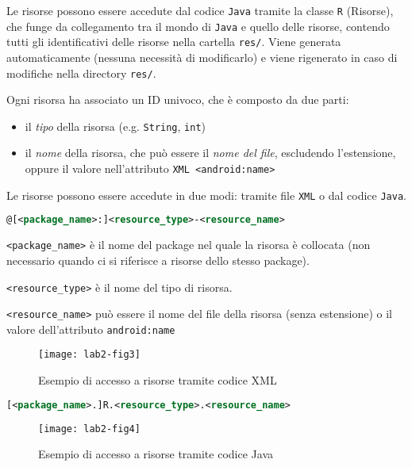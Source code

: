 Le risorse possono essere accedute dal codice \texttt{Java} tramite la classe \texttt{R} (Risorse), che funge da collegamento tra il mondo di \texttt{Java} e quello delle risorse, contendo tutti gli identificativi delle risorse nella cartella \texttt{res/}. Viene generata automaticamente (nessuna necessità di modificarlo) e viene rigenerato in caso di modifiche nella directory \texttt{res/}.

Ogni risorsa ha associato un ID univoco, che è composto da due parti:
\begin{itemize}
\item il \textit{tipo} della risorsa (e.g. \texttt{String}, \texttt{int})
\item il \textit{nome} della risorsa, che può essere il \textit{nome del file}, escludendo l'estensione, oppure il valore nell'attributo \texttt{XML <android:name>}
\end{itemize}

Le risorse possono essere accedute in due modi: tramite file \texttt{XML} o dal codice \texttt{Java}.



\begin{lstlisting}[language=XML, basicstyle=\footnotesize]
@[<package_name>:]<resource_type>-<resource_name>
\end{lstlisting}

\texttt{<package\_name>} è il nome del package nel quale la risorsa è collocata (non necessario quando ci si riferisce a risorse dello stesso package).

\texttt{<resource\_type>} è il nome del tipo di risorsa.

\texttt{<resource\_name>} può essere il nome del file della risorsa (senza estensione) o il valore dell'attributo \texttt{android:name} 

\begin{figure}[htbp]
	\centering
	\texttt{[image: lab2-fig3]}
	\caption[Accesso Risorse XML]{Esempio di accesso a risorse tramite codice XML}\label{img:lab2-fig3}
\end{figure}


\begin{lstlisting}[language=XML, basicstyle=\footnotesize]
[<package_name>.]R.<resource_type>.<resource_name>
\end{lstlisting}

\begin{figure}[htbp]
	\centering
	\texttt{[image: lab2-fig4]}
	\caption[Accesso Risorse Java]{Esempio di accesso a risorse tramite codice Java}\label{img:lab2-fig4}
\end{figure}

